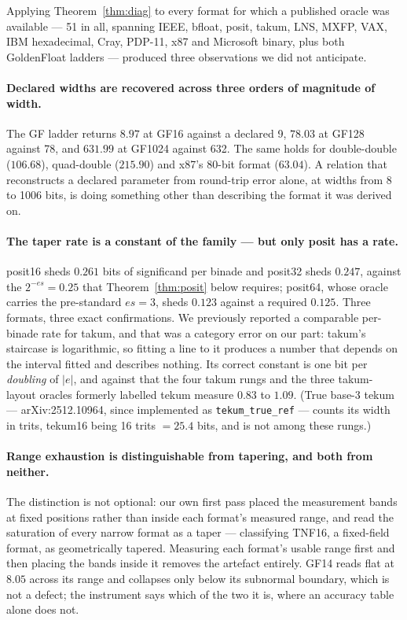 \documentclass[11pt]{article}
\theoremstyle{definition}
\begin{document}
Applying Theorem~\ref{thm:diag} to every format for which a published oracle was
available --- 51 in all, spanning IEEE, bfloat, posit, takum, LNS, MXFP, VAX, IBM
hexadecimal, Cray, PDP-11, x87 and Microsoft binary, plus both GoldenFloat ladders
--- produced three observations we did not anticipate.

\paragraph{Declared widths are recovered across three orders of magnitude of
width.} The GF ladder returns $8.97$ at GF16 against a declared 9, $78.03$ at
GF128 against 78, and $631.99$ at GF1024 against 632. The same holds for
double-double ($106.68$), quad-double ($215.90$) and x87's 80-bit format
($63.04$). A relation that reconstructs a declared parameter from round-trip error
alone, at widths from 8 to 1006 bits, is doing something other than describing the
format it was derived on.

\paragraph{The taper rate is a constant of the family --- but only posit has a
rate.} posit16 sheds $0.261$ bits of significand per binade and posit32 sheds
$0.247$, against the $2^{-es} = 0.25$ that Theorem~\ref{thm:posit} below requires;
posit64, whose oracle carries the pre-standard $es = 3$, sheds $0.123$ against a
required $0.125$. Three formats, three exact confirmations. We previously reported
a comparable per-binade rate for takum, and that was a category error on our part:
takum's staircase is logarithmic, so fitting a line to it produces a number that
depends on the interval fitted and describes nothing. Its correct constant is one
bit per \emph{doubling} of $|e|$, and against that the four takum rungs and the
three takum-layout oracles formerly labelled tekum measure $0.83$ to $1.09$.
(True base-3 tekum --- arXiv:2512.10964, since implemented as
\texttt{tekum\_true\_ref} --- counts its width in trits, tekum16 being 16 trits
$= 25.4$ bits, and is not among these rungs.)

\paragraph{Range exhaustion is distinguishable from tapering, and both from
neither.} The distinction is not optional: our own first pass placed the
measurement bands at fixed positions rather than inside each format's measured
range, and read the saturation of every narrow format as a taper --- classifying
TNF16, a fixed-field format, as geometrically tapered. Measuring each format's
usable range first and then placing the bands inside it removes the artefact
entirely. GF14 reads flat at $8.05$ across its range and collapses only below its
subnormal boundary, which is not a defect; the instrument says which of the two it
is, where an accuracy table alone does not.
\end{document}
